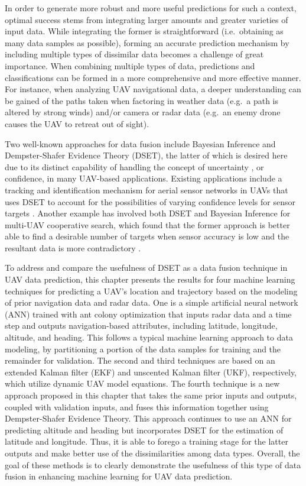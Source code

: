 \documentclass[12pt]{uthesis-v12}  %
\begin{document}
In order to generate more robust and more useful predictions for such a context, optimal success stems from integrating larger amounts and greater varieties of input data. 
While integrating the former is straightforward (i.e.~obtaining as many data samples as possible), forming an accurate prediction mechanism by including multiple types of dissimilar data becomes a challenge of great importance. 
When combining multiple types of data, predictions and classifications can be formed in a more comprehensive and more effective manner. 
For instance, when analyzing UAV navigational data, a deeper understanding can be gained of the paths taken when factoring in weather data (e.g.~a path is altered by strong winds) and/or camera or radar data (e.g.~an enemy drone causes the UAV to retreat out of sight).

Two well-known approaches for data fusion include Bayesian Inference and Dempster-Shafer Evidence Theory (DSET), the latter of which is desired here due to its distinct capability of handling the concept of uncertainty \cite{bloch}, or confidence, in many UAV-based applications.
Existing applications include a tracking and identification mechanism for aerial sensor networks in UAVs that uses DSET to account for the possibilities of varying confidence levels for sensor targets \cite{yu}.
Another example has involved both DSET and Bayesian Inference for multi-UAV cooperative search, which found that the former approach is better able to find a desirable number of targets when sensor accuracy is low and the resultant data is more contradictory \cite{yang}.

To address and compare the usefulness of DSET as a data fusion technique in UAV data prediction, this chapter presents the results for four machine learning techniques for predicting a UAV's location and trajectory based on the modeling of prior navigation data and radar data.
One is a simple artificial neural network (ANN) trained with ant colony optimization that inputs radar data and a time step and outputs navigation-based attributes, including latitude, longitude, altitude, and heading.
This follows a typical machine learning approach to data modeling, by partitioning a portion of the data samples for training and the remainder for validation. 
The second and third techniques are based on an extended Kalman filter (EKF) and unscented Kalman filter (UKF), respectively, which utilize dynamic UAV model equations.
The fourth technique is a new approach proposed in this chapter that takes the same prior inputs and outputs, coupled with validation inputs, and fuses this information together using Dempster-Shafer Evidence Theory.
This approach continues to use an ANN for predicting altitude and heading but incorporates DSET for the estimation of latitude and longitude.
Thus, it is able to forego a training stage for the latter outputs and make better use of the dissimilarities among data types.
Overall, the goal of these methods is to clearly demonstrate the usefulness of this type of data fusion in enhancing machine learning for UAV data prediction.
\end{document}
